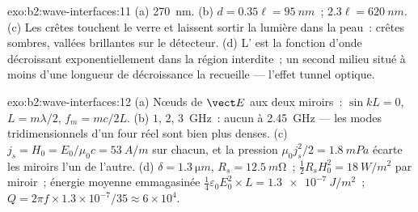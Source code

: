 \begin{solution}{exo:b2:wave-interfaces:11}
(a) \qty{270}{nm}. (b) $d = 0.35\ell = \qty{95}{nm}$~; $2.3\ell = \qty{620}{nm}$. (c) Les
crêtes touchent le verre et laissent sortir la lumière dans la peau~: crêtes
sombres, vallées brillantes sur le détecteur. (d) L' est la
fonction d'onde décroissant exponentiellement dans la région interdite~; un second
milieu situé à moins d'une longueur de décroissance la recueille --- l'effet tunnel optique.
\end{solution}

\begin{solution}{exo:b2:wave-interfaces:12}
(a) Nœuds de $\vect E$ aux deux miroirs~: $\sin kL = 0$, $L = m\lambda/2$, $f_m = mc/2L$.
(b) $1$, $2$, \qty{3}{GHz}~: aucun à \qty{2.45}{GHz} --- les modes tridimensionnels
d'un four réel sont bien plus denses. (c) $j_s = H_0 = E_0/\mu_0c = \qty{53}{A/m}$
sur chacun, et la pression $\mu_0j_s^2/2 = \qty{1.8}{mPa}$ écarte les miroirs
l'un de l'autre. (d) $\delta = \qty{1.3}{\micro m}$, $R_s = \qty{12.5}{m\ohm}$~; $\tfrac12R_sH_0^2 =
\qty{18}{W/m^2}$ par miroir~; énergie moyenne emmagasinée $\tfrac14\varepsilon_0E_0^2 \times L = \qty{1.3e-7}{J/m^2}$~;
$Q = 2\pi f \times 1.3 \times 10^{-7}/35 \approx 6 \times 10^4$.
\end{solution}

